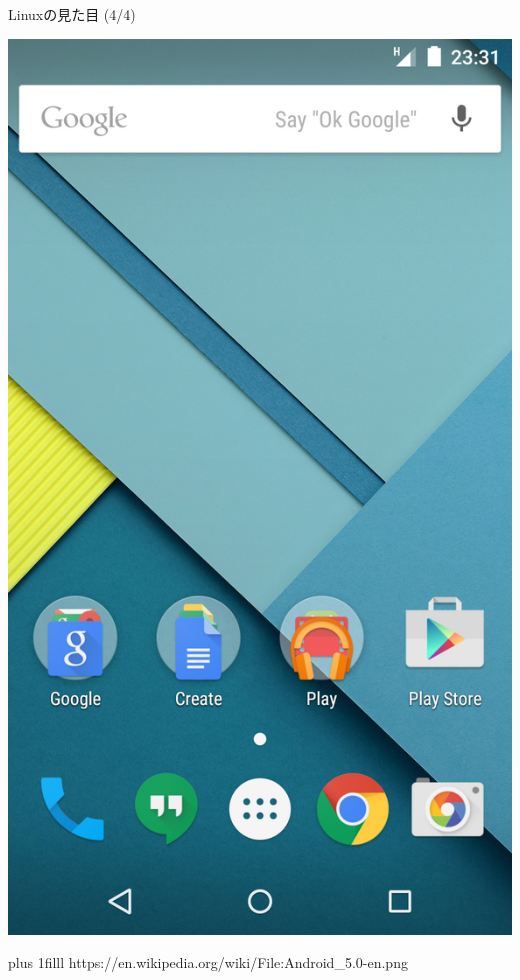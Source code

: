 \documentclass[uplatex, dvipdfmx, 12pt]{beamer}
\newcommand{\source}[1]{{\vskip0pt plus 1filll \scriptsize #1}}
\begin{document}
\begin{frame}{Linuxの見た目 (4/4)}
  \begin{center}\includegraphics[height=0.9\textheight]{./figures/Android.png}\end{center}
    \source{https://en.wikipedia.org/wiki/File:Android_5.0-en.png}
\end{frame}
\end{document}
